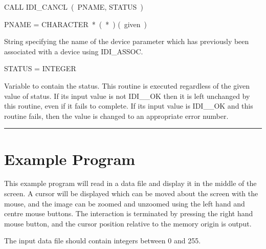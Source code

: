 \documentclass[11pt,nolof]{starlink}
\begin{document}
{\hspace*{10mm}\parbox{140mm}{
CALL IDI\_CANCL~(~PNAME, STATUS~)}

\hspace*{10mm}\parbox{140mm}{
PNAME = CHARACTER~*~(~*~) \hspace{10mm} (~given~)}

\hspace*{30mm}\parbox{120mm}{
String specifying the name of the device parameter which has previously
been associated with a device using IDI\_ASSOC.}

\hspace*{10mm}\parbox{140mm}{
STATUS = INTEGER}

\hspace*{30mm}\parbox{120mm}{
Variable to contain the status. This routine is executed regardless of the
given value of status. If its input value is not IDI\_\_OK then it is left
unchanged by this routine, even if it fails to complete. If its input value
is IDI\_\_OK and this routine fails, then the value is changed to an
appropriate error number.}

\rule{160mm}{0.5mm}
}


\newpage
\section{Example Program}
\label{se:exp}

This example program will read in a data file and display it in the
middle of the screen. A cursor will be displayed which can be
moved about the screen with the mouse, and the image can be zoomed
and unzoomed using the left hand and centre mouse buttons. The
interaction is terminated by pressing the right hand mouse button, and
the cursor position relative to the memory origin is output.

The input data file should contain integers between 0 and 255.
\end{document}
